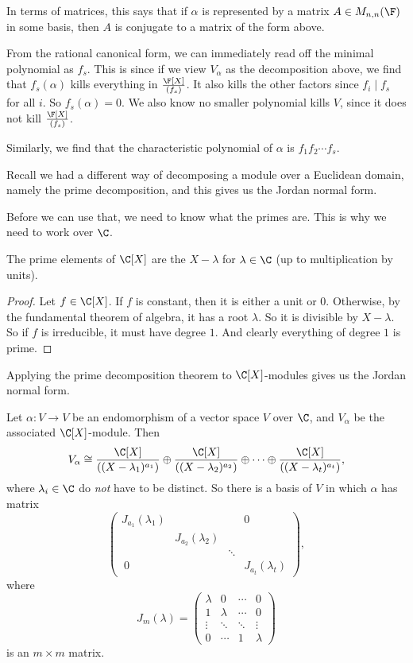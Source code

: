\documentclass[a4paper]{article}
\begin{document}
In terms of matrices, this says that if $\alpha$ is represented by a matrix $A \in M_{n, n} (\F)$ in some basis, then $A$ is conjugate to a matrix of the form above.

From the rational canonical form, we can immediately read off the minimal polynomial as $f_s$. This is since if we view $V_\alpha$ as the decomposition above, we find that $f_s(\alpha)$ kills everything in $\frac{\F[X]}{(f_s)}$. It also kills the other factors since $f_i \mid f_s$ for all $i$. So $f_s(\alpha) = 0$. We also know no smaller polynomial kills $V$, since it does not kill $\frac{\F[X]}{(f_s)}$.

Similarly, we find that the characteristic polynomial of $\alpha$ is $f_1 f_2 \cdots f_s$.

Recall we had a different way of decomposing a module over a Euclidean domain, namely the prime decomposition, and this gives us the Jordan normal form.

Before we can use that, we need to know what the primes are. This is why we need to work over $\C$.

\begin{lemma}
  The prime elements of $\C[X]$ are the $X - \lambda$ for $\lambda \in \C$ (up to multiplication by units).
\end{lemma}

\begin{proof}
  Let $f \in \C[X]$. If $f$ is constant, then it is either a unit or $0$. Otherwise, by the fundamental theorem of algebra, it has a root $\lambda$. So it is divisible by $X - \lambda$. So if $f$ is irreducible, it must have degree $1$. And clearly everything of degree $1$ is prime.
\end{proof}

Applying the prime decomposition theorem to $\C[X]$-modules gives us the Jordan normal form.

\begin{thm}
  Let $\alpha: V \to V$ be an endomorphism of a vector space $V$ over $\C$, and $V_\alpha$ be the associated $\C[X]$-module. Then
  \[
    V_\alpha \cong \frac{\C[X]}{((X - \lambda_1)^{a_1})} \oplus \frac{\C[X]}{((X - \lambda_2)^{a_2})} \oplus \cdots \oplus \frac{\C[X]}{((X - \lambda_t)^{a_t})},
  \]
  where $\lambda_i \in \C$ do \emph{not} have to be distinct. So there is a basis of $V$ in which $\alpha$ has matrix
  \[
    \begin{pmatrix}
      J_{a_1}(\lambda_1) & & & 0\\
      & J_{a_2}(\lambda_2)\\
      & & \ddots\\\
      0 & & & J_{a_t} (\lambda_t)
    \end{pmatrix},
  \]
  where
  \[
    J_m (\lambda) =
    \begin{pmatrix}
      \lambda & 0 & \cdots & 0\\
      1 & \lambda & \cdots & 0\\
      \vdots & \ddots & \ddots & \vdots\\
      0 & \cdots & 1 & \lambda
    \end{pmatrix}
  \]
  is an $m \times m$ matrix.
\end{thm}
\end{document}
